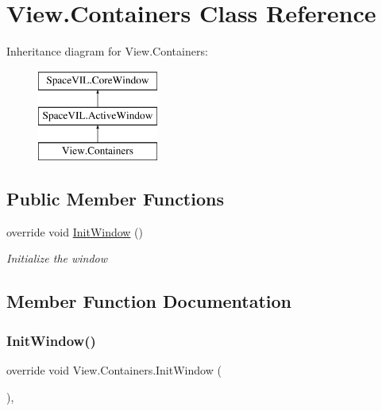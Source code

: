 \hypertarget{class_view_1_1_containers}{}\section{View.\+Containers Class Reference}
\label{class_view_1_1_containers}
Inheritance diagram for View.\+Containers\+:\begin{figure}[H]
\begin{center}
\leavevmode
\includegraphics[height=3.000000cm]{class_view_1_1_containers}
\end{center}
\end{figure}
\subsection*{Public Member Functions}
\begin{DoxyCompactItemize}
\item 
override void \mbox{\hyperlink{class_view_1_1_containers_a78f0f1f1a35caf1cc7a1f4a9a9d159a2}{Init\+Window}} ()
\begin{DoxyCompactList}\small\item\em Initialize the window \end{DoxyCompactList}\end{DoxyCompactItemize}


\subsection{Member Function Documentation}
\mbox{\label{class_view_1_1_containers_a78f0f1f1a35caf1cc7a1f4a9a9d159a2}} 
\subsubsection{\texorpdfstring{Init\+Window()}{InitWindow()}}
{\footnotesize\ttfamily override void View.\+Containers.\+Init\+Window (\begin{DoxyParamCaption}{ }\end{DoxyParamCaption})\hspace{0.3cm}{\ttfamily [inline]}, {\ttfamily [virtual]}}



